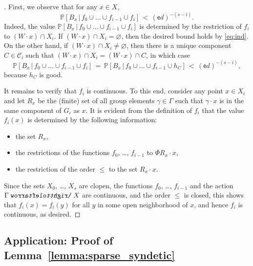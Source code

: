 \documentclass[11pt,reqno,psamsfonts]{amsart}
\theoremstyle{bfnote}
\theoremstyle{definition}
\theoremstyle{remark}
\newcommand{\0}{\varnothing}
\renewcommand{\P}{\mathbb{P}}
\renewcommand{\leq}{\leqslant}
\newcommand{\acts}{\mathrel{\reflectbox{$\righttoleftarrow$}}}
\newcommand{\G}{\Gamma}
\numberwithin{equation}{section}
\newenvironment{scproof}[1][]{\begin{proof}[\textsc{\upshape{Proof}}#1]}{\end{proof}}
\begin{document}
\begin{scproof}
        First, we observe that for any $x \in X$,
        \[
            \P[B_x \,\vert\, f_0 \cup \ldots \cup f_{i-1} \cup f_i] \,<\, (\mathsf{e}d)^{-(s-i)}.
        \]
        Indeed, the value $\P[B_x \,\vert\, f_0 \cup \ldots \cup f_{i-1} \cup f_i]$ is determined by the restriction of $f_i$ to $(W \cdot x) \cap X_i$. If $(W \cdot x) \cap X_i = \0$, then the desired bound holds by \eqref{eq:ind}. 
        On the other hand, if $(W \cdot x) \cap X_i \neq \0$, then there is a unique component $C \in \mathcal{C}_i$ such that $(W \cdot x) \cap X_i = (W \cdot x) \cap C$, in which case
        \[
            \P[B_x \,\vert\, f_0 \cup \ldots \cup f_{i-1} \cup f_i] \,=\, \P[B_x \,\vert\, f_0 \cup \ldots \cup f_{i-1} \cup h_C] \,<\, (\mathsf{e}d)^{-(s-i)},
        \]
        because $h_C$ is good.

        It remains to verify that $f_i$ is continuous. To this end, consider any point $x \in X_i$ and let $R_x$ be the (finite) set of all group elements $\gamma \in \G$ such that $\gamma \cdot x$ is in the same component of $G_i$ as $x$. It is evident from the definition of $f_i$ that the value $f_i(x)$ is determined by the following information:
        \begin{itemize}
            \item the set $R_x$,
            \item the restrictions of the functions $f_0$, \ldots, $f_{i-1}$ to $\Phi R_x \cdot x$,
            \item the restriction of the order $\leq$ to the set $R_x \cdot x$.
        \end{itemize}
        Since the sets $X_0$, \ldots, $X_s$ are clopen, the functions $f_0$, \ldots, $f_{i-1}$ and the action %
        $\G \acts X$ are continuous, %
        and the order $\leq$ is closed, this shows that $f_i(x) = f_i(y)$ for all $y$ in some open neighborhood of $x$, and hence $f_i$ is continuous, as desired.
     \end{scproof}


    \subsection{Application: Proof of Lemma~\ref{lemma:sparse_syndetic}}\label{subsec:synd_and_spaced}
\end{document}
